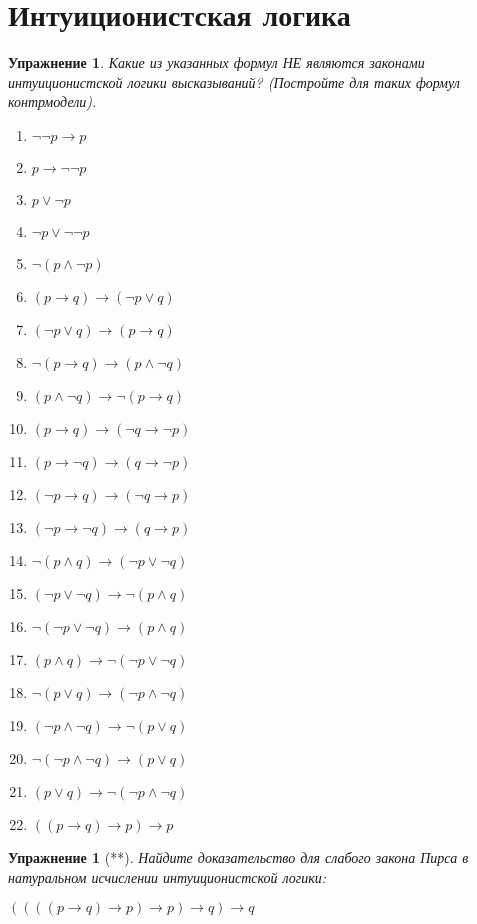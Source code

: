 \documentclass[11pt]{article}
\newtheorem{exercise}[theorem]{Упражнение}
\begin{document}
\section{Интуиционистская логика}
\begin{exercise} Какие из указанных формул НЕ являются законами интуиционистской логики высказываний? (Постройте для таких формул контрмодели).
\begin{multicols}{2}
\begin{enumerate}
	\item $\neg \neg p \to p$
	\item $p \to \neg \neg p$
	\item $p \vee \neg p$
	\item $\neg p \vee \neg \neg p$
	\item $\neg (p \wedge \neg p)$
	\item $(p \to q) \to (\neg p \vee q)$
	\item $(\neg p \vee q) \to (p \to q)$
	\item $\neg (p \to q) \to (p \wedge \neg q)$
	\item $(p \wedge \neg q) \to \neg (p \to q) $
	\item $(p \to q) \to (\neg q \to \neg p)$
	\item $(p \to \neg q) \to (q \to \neg p)$
	\item $(\neg p \to q) \to (\neg q \to p)$
	\item $(\neg p \to \neg q) \to (q \to p)$
	\item $\neg (p \wedge q) \to (\neg p \vee \neg q)$
    \item $(\neg p \vee \neg q) \to \neg (p \wedge q)$
    \item $\neg (\neg p \vee \neg q) \to (p \wedge q)$
    \item $(p \wedge q) \to \neg (\neg p \vee \neg q)$
  	\item $\neg (p \vee q) \to (\neg p \wedge \neg q)$
  	\item $(\neg p \wedge \neg q) \to \neg (p \vee q)$
    \item $\neg  (\neg p \wedge  \neg q) \to (p \vee q)$
    \item $(p \vee q) \to \neg  (\neg p \wedge  \neg q)$
    \item $((p \to q) \to p) \to p $
\end{enumerate}
\end{multicols}
\end{exercise}


\begin{exercise}[**] Найдите доказательство для слабого закона Пирса в натуральном исчислении интуиционистской логики:
\begin{center}
    $((((p\to q) \to p) \to p) \to q) \to q $
\end{center}

\end{exercise}
\end{document}
